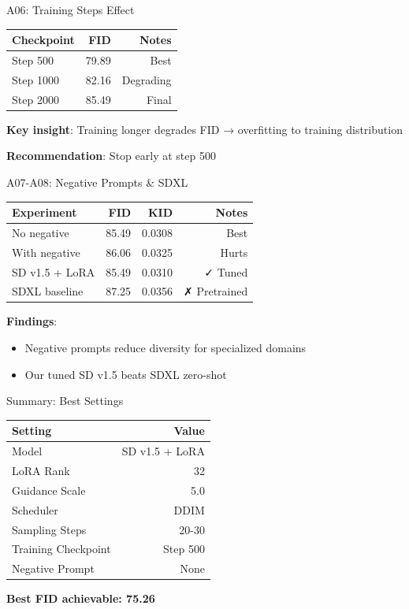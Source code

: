 \documentclass{beamer}
\begin{document}
\begin{frame}{A06: Training Steps Effect}
\begin{table}
\centering
\begin{tabular}{lrr}
\toprule
Checkpoint & FID & Notes \\
\midrule
Step 500 & 79.89 & Best \\
Step 1000 & 82.16 & Degrading \\
Step 2000 & 85.49 & Final \\
\bottomrule
\end{tabular}
\end{table}

\vspace{0.5cm}
\textbf{Key insight}: Training longer degrades FID → overfitting to training distribution

\textbf{Recommendation}: Stop early at step 500
\end{frame}

\begin{frame}{A07-A08: Negative Prompts \& SDXL}
\begin{table}
\centering
\begin{tabular}{lrrr}
\toprule
Experiment & FID & KID & Notes \\
\midrule
No negative & 85.49 & 0.0308 & Best \\
With negative & 86.06 & 0.0325 & Hurts \\
\midrule
SD v1.5 + LoRA & 85.49 & 0.0310 & ✓ Tuned \\
SDXL baseline & 87.25 & 0.0356 & ✗ Pretrained \\
\bottomrule
\end{tabular}
\end{table}

\textbf{Findings}:
\begin{itemize}
    \item Negative prompts reduce diversity for specialized domains
    \item Our tuned SD v1.5 beats SDXL zero-shot
\end{itemize}
\end{frame}

\begin{frame}{Summary: Best Settings}
\begin{table}
\centering
\begin{tabular}{lr}
\toprule
Setting & Value \\
\midrule
Model & SD v1.5 + LoRA \\
LoRA Rank & 32 \\
Guidance Scale & 5.0 \\
Scheduler & DDIM \\
Sampling Steps & 20-30 \\
Training Checkpoint & Step 500 \\
Negative Prompt & None \\
\bottomrule
\end{tabular}
\end{table}

\vspace{0.3cm}
\textbf{Best FID achievable: 75.26}
\end{frame}
\end{document}

